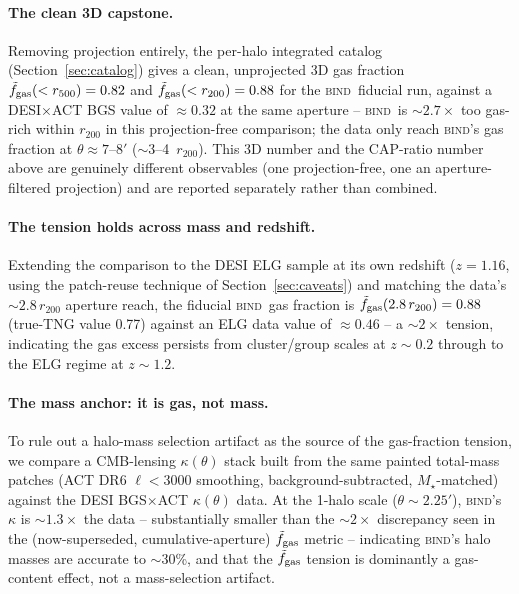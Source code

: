 \documentclass[11pt]{article}
\newcommand{\bind}{\textsc{bind}}
\newcommand{\fgt}{\tilde{f}_{\rm gas}}          %
\begin{document}
\paragraph{The clean 3D capstone.} Removing projection entirely, the per-halo
integrated catalog (Section~\ref{sec:catalog}) gives a clean, unprojected
3D gas fraction $\fgt(<r_{500})=0.82$ and $\fgt(<r_{200})=0.88$ for the \bind\
fiducial run, against a DESI$\times$ACT BGS value of $\approx0.32$ at the same
aperture -- \bind\ is $\sim2.7\times$ too gas-rich within $r_{200}$ in this
projection-free comparison; the data only reach \bind's gas fraction at
$\theta\approx7$--8$'$ ($\sim3$--4~$r_{200}$). %
This 3D number and the CAP-ratio number above are genuinely different
observables (one projection-free, one an aperture-filtered projection) and are
reported separately rather than combined.

\paragraph{The tension holds across mass and redshift.} Extending the
comparison to the DESI ELG sample at its own redshift ($z=1.16$, using the
patch-reuse technique of Section~\ref{sec:caveats}) and matching the data's
$\sim2.8\,r_{200}$ aperture reach, the fiducial \bind\ gas fraction is
$\fgt(2.8\,r_{200})=0.88$ (true-TNG value 0.77) against an ELG data value of
$\approx0.46$ -- a $\sim2\times$ tension, indicating the gas excess persists
from cluster/group scales at $z\sim0.2$ through to the ELG regime at
$z\sim1.2$. %

\paragraph{The mass anchor: it is gas, not mass.} To rule out a halo-mass
selection artifact as the source of the gas-fraction tension, we compare a
CMB-lensing $\kappa(\theta)$ stack built from the same painted total-mass
patches (ACT DR6 $\ell<3000$ smoothing, background-subtracted,
$M_\star$-matched) against the DESI BGS$\times$ACT $\kappa(\theta)$ data. At
the 1-halo scale ($\theta\sim2.25'$), \bind's $\kappa$ is $\sim1.3\times$ the
data -- substantially smaller than the $\sim2\times$ discrepancy seen in the
(now-superseded, cumulative-aperture) $\fgt$ metric -- indicating \bind's halo
masses are accurate to $\sim$30\%, and that the $\fgt$ tension is dominantly a
gas-content effect, not a mass-selection artifact. %
\end{document}
